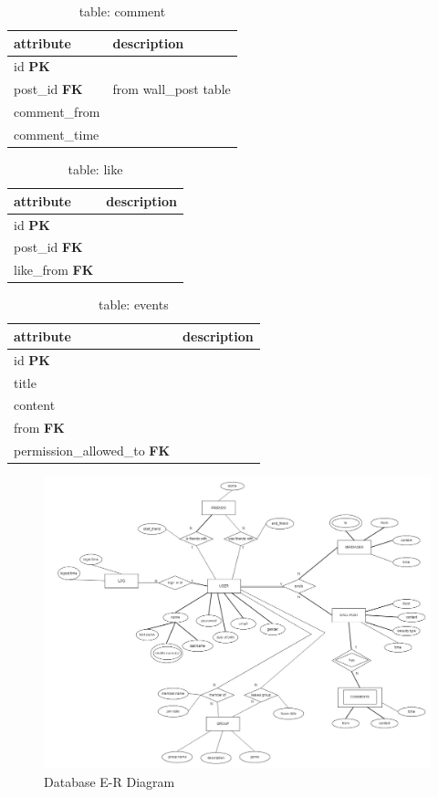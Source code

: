 \begin{table}[h]
    \centering
    \begin{tabular}{ll}
    attribute            & description\\ \hline
    id \textbf{PK}       & \\
    post\_id \textbf{FK} & from wall\_post table\\
    comment\_from        & \\
    comment\_time        & \\
    \end{tabular}
    \caption{table: comment}
\end{table}

\begin{table}[h]
    \centering
    \begin{tabular}{ll}
    attribute              & description\\ \hline
    id \textbf{PK}         & \\
    post\_id \textbf{FK}   & \\
    like\_from \textbf{FK} & \\
    \end{tabular}
    \caption{table: like}
\end{table}

\begin{table}[h]
    \centering
    \begin{tabular}{ll}
    attribute                           & description\\ \hline
    id \textbf{PK}                      & \\
    title                               & \\
    content                             & \\ 
    from \textbf{FK}                    & \\
    permission\_allowed\_to \textbf{FK} & \\
    \end{tabular}
    \caption{table: events}
\end{table}

\begin{figure}[h]
    \centering
    \includegraphics[width=\textwidth]{images/design/er_diagram.jpg}
    \caption{Database E-R Diagram}
    \label{fig:db_er_diag}
\end{figure}
